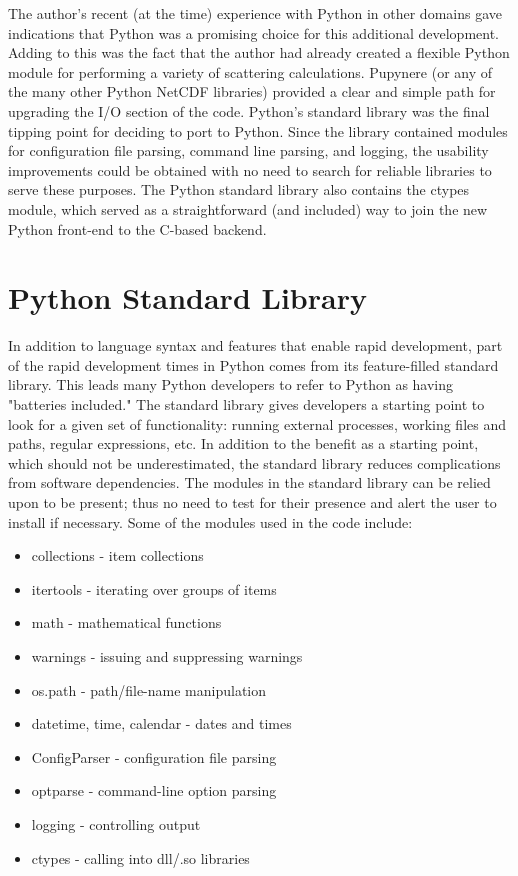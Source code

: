 \documentclass[twocolumn]{article}
\begin{document}
The author's recent (at the time) experience with Python in other domains gave
indications that Python was a promising choice for this additional development.
Adding to this was the fact that the author had already created a flexible Python
module for performing a variety of scattering calculations. Pupynere (or any
of the many other Python NetCDF libraries) provided a clear and simple path
for upgrading the I/O section of the code. Python's standard
library was the final tipping point for deciding to port to Python. Since the
library contained modules for configuration file parsing, command line parsing,
and logging, the usability improvements could be obtained with no need to search
for reliable libraries to serve these purposes. The Python standard library also
contains the ctypes module, which served as a straightforward (and included) way
to join the new Python front-end to the C-based backend.


\section{Python Standard Library}
In addition to language syntax and features that enable rapid development, part of 
the rapid development times in Python comes from its feature-filled standard library. This leads
many Python developers to refer to Python as having "batteries included." The standard
library gives developers a starting point to look for a given set of functionality: 
running external processes, working files and paths, regular expressions, etc. In addition
to the benefit as a starting point, which should not be underestimated, the standard
library reduces complications from software dependencies. The modules in the standard
library can be relied upon to be present; thus no need to test for their presence
and alert the user to install if necessary. Some of the modules used in the code include:

\begin{itemize}
    \item collections - item collections
    \item itertools - iterating over groups of items
    \item math - mathematical functions
    \item warnings - issuing and suppressing warnings
    \item os.path - path/file-name manipulation
    \item datetime, time, calendar - dates and times
    \item ConfigParser - configuration file parsing
    \item optparse - command-line option parsing
    \item logging - controlling output
    \item ctypes - calling into dll/.so libraries
\end{itemize}
\end{document}
